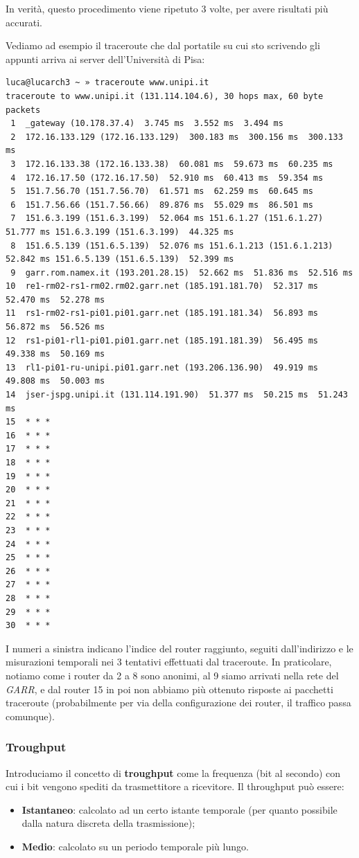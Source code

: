 \documentclass[a4paper,11pt]{article}
\begin{document}
In verità, questo procedimento viene ripetuto 3 volte, per avere risultati più accurati.

Vediamo ad esempio il traceroute che dal portatile su cui sto scrivendo gli appunti arriva ai server dell'Università di Pisa:
\begin{lstlisting}[style=shellstyle]
luca@lucarch3 ~ » traceroute www.unipi.it
traceroute to www.unipi.it (131.114.104.6), 30 hops max, 60 byte packets
 1  _gateway (10.178.37.4)  3.745 ms  3.552 ms  3.494 ms
 2  172.16.133.129 (172.16.133.129)  300.183 ms  300.156 ms  300.133 ms
 3  172.16.133.38 (172.16.133.38)  60.081 ms  59.673 ms  60.235 ms
 4  172.16.17.50 (172.16.17.50)  52.910 ms  60.413 ms  59.354 ms
 5  151.7.56.70 (151.7.56.70)  61.571 ms  62.259 ms  60.645 ms
 6  151.7.56.66 (151.7.56.66)  89.876 ms  55.029 ms  86.501 ms
 7  151.6.3.199 (151.6.3.199)  52.064 ms 151.6.1.27 (151.6.1.27)  51.777 ms 151.6.3.199 (151.6.3.199)  44.325 ms
 8  151.6.5.139 (151.6.5.139)  52.076 ms 151.6.1.213 (151.6.1.213)  52.842 ms 151.6.5.139 (151.6.5.139)  52.399 ms
 9  garr.rom.namex.it (193.201.28.15)  52.662 ms  51.836 ms  52.516 ms
10  re1-rm02-rs1-rm02.rm02.garr.net (185.191.181.70)  52.317 ms  52.470 ms  52.278 ms
11  rs1-rm02-rs1-pi01.pi01.garr.net (185.191.181.34)  56.893 ms  56.872 ms  56.526 ms
12  rs1-pi01-rl1-pi01.pi01.garr.net (185.191.181.39)  56.495 ms  49.338 ms  50.169 ms
13  rl1-pi01-ru-unipi.pi01.garr.net (193.206.136.90)  49.919 ms  49.808 ms  50.003 ms
14  jser-jspg.unipi.it (131.114.191.90)  51.377 ms  50.215 ms  51.243 ms
15  * * *
16  * * *
17  * * *
18  * * *
19  * * *
20  * * *
21  * * *
22  * * *
23  * * *
24  * * *
25  * * *
26  * * *
27  * * *
28  * * *
29  * * *
30  * * *
\end{lstlisting}
I numeri a sinistra indicano l'indice del router raggiunto, seguiti dall'indirizzo e le misurazioni temporali nei 3 tentativi effettuati dal traceroute.
In praticolare, notiamo come i router da 2 a 8 sono anonimi, al 9 siamo arrivati nella rete del \textit{GARR}, e dal router 15 in poi non abbiamo più ottenuto risposte ai pacchetti traceroute (probabilmente per via della configurazione dei router, il traffico passa comunque).

\subsubsection{Troughput}
Introduciamo il concetto di \textbf{troughput} come la frequenza (bit al secondo) con cui i bit vengono spediti da trasmettitore a ricevitore.
Il throughput può essere:
\begin{itemize}
	\item \textbf{Istantaneo}: calcolato ad un certo istante temporale (per quanto possibile dalla natura discreta della trasmissione);
	\item \textbf{Medio}: calcolato su un periodo temporale più lungo.
\end{itemize}
\end{document}
